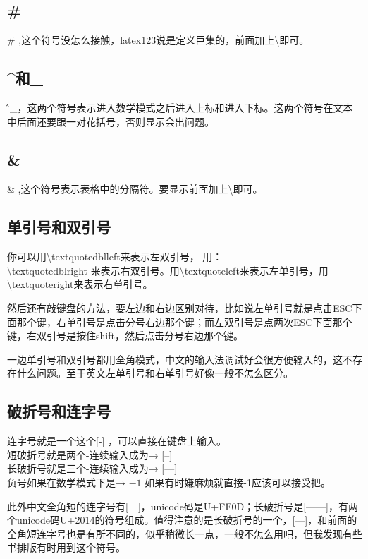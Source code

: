 \documentclass[11pt,oneside]{book}
\begin{document}
  \subsection{\#}
  \# ,这个符号没怎么接触，latex123说是定义巨集的，前面加上\textbackslash 即可。

  \subsection{\^{}和\_{}}
  \^和\_{}，这两个符号表示进入数学模式之后进入上标和进入下标。这两个符号在文本中后面还要跟一对花括号，否则显示会出问题。

  \subsection{\&}
  \& ,这个符号表示表格中的分隔符。要显示前面加上\textbackslash 即可。

  \subsection{单引号和双引号}
  你可以用\textbackslash textquotedblleft来表示左双引号， 用：\\
  \textbackslash textquotedblright 来表示右双引号。用\textbackslash textquoteleft来表示左单引号，用\textbackslash textquoteright来表示右单引号。

  然后还有敲键盘的方法，要左边和右边区别对待，比如说左单引号就是点击ESC下面那个键，右单引号是点击分号右边那个键；而左双引号是点两次ESC下面那个键，右双引号是按住shift，然后点击分号右边那个键。

  一边单引号和双引号都用全角模式，中文的输入法调试好会很方便输入的，这不存在什么问题。至于英文左单引号和右单引号好像一般不怎么区分。

  \subsection{破折号和连字号}
  连字号就是一个这个[-] ，可以直接在键盘上输入。\\
  短破折号就是两个-连续输入成为→  [--]\\
  长破折号就是三个-连续输入成为→  [---]\\
  负号如果在数学模式下是→  $ -1 $  如果有时嫌麻烦就直接-1应该可以接受把。

  此外中文全角短的连字号有[－]，unicode码是U+FF0D；长破折号是[——]，有两个unicode码U+2014的符号组成。值得注意的是长破折号的一个，[—]，和前面的全角短连字号也是有所不同的，似乎稍微长一点，一般不怎么用吧，但我发现有些书排版有时用到这个符号。
\end{document}
